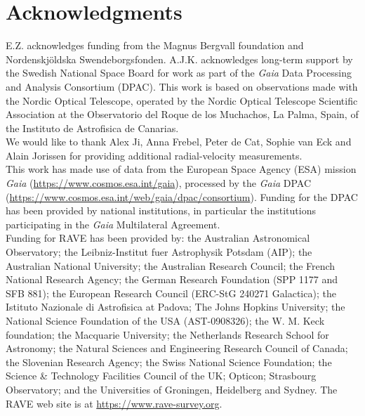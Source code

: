 \documentclass[twocolumn]{aastex6}
\begin{document}
\acknowledgments
\section*{Acknowledgments}
E.Z. acknowledges funding from the Magnus Bergvall foundation and Nordenskj\"{o}ldska Swendeborgsfonden. 
A.J.K. acknowledges long-term support by the Swedish National Space Board for work as part of the {\it Gaia} Data Processing and Analysis Consortium (DPAC). 
This work is based on observations made with the Nordic Optical Telescope, operated by the Nordic Optical Telescope Scientific Association at the Observatorio del Roque de los Muchachos, La Palma, Spain, of the Instituto de Astrofisica de Canarias. \\
We would like to thank Alex Ji, Anna Frebel, Peter de Cat, Sophie van Eck and Alain Jorissen for providing additional radial-velocity measurements.\\ 
This work has made use of data from the European Space Agency (ESA) mission {\it Gaia} (\url{https://www.cosmos.esa.int/gaia}), processed by
the {\it Gaia} DPAC (\url{https://www.cosmos.esa.int/web/gaia/dpac/consortium}). Funding for the DPAC has been provided by national institutions, in particular the institutions participating in the {\it Gaia} Multilateral Agreement.\\
Funding for RAVE has been provided by: the Australian Astronomical Observatory; the Leibniz-Institut fuer Astrophysik Potsdam (AIP); the Australian National University; the Australian Research Council; the French National Research Agency; the German Research Foundation (SPP 1177 and SFB 881); the European Research Council (ERC-StG 240271 Galactica); the Istituto Nazionale di Astrofisica at Padova; The Johns Hopkins University; the National Science Foundation of the USA (AST-0908326); the W. M. Keck foundation; the Macquarie University; the Netherlands Research School for Astronomy; the Natural Sciences and Engineering Research Council of Canada; the Slovenian Research Agency; the Swiss National Science Foundation; the Science \& Technology Facilities Council of the UK; Opticon; Strasbourg Observatory; and the Universities of Groningen, Heidelberg and Sydney.
The RAVE web site is at \url{https://www.rave-survey.org}.


\end{document}
